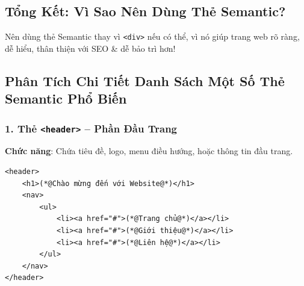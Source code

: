 \documentclass[11pt,oneside]{book}
\newcommand{\thd}[1]{\textcolor{white}{\textbf{\strut #1}}}
\newcommand{\codeinline}[1]{\textcolor{accentOrange}{\texttt{#1}}}
\begin{document}
\subsection{Tổng Kết: Vì Sao Nên Dùng Thẻ Semantic?}

\begin{prettyTableBox}
\end{prettyTableBox}

\begin{conceptBox}
Nên dùng thẻ Semantic thay vì \codeinline{<div>} nếu có thể, vì nó giúp trang web rõ ràng, dễ hiểu, thân thiện với SEO \& dễ bảo trì hơn!
\end{conceptBox}

\subsection{Phân Tích Chi Tiết Danh Sách Một Số Thẻ Semantic Phổ Biến}

\subsubsection{1. Thẻ \codeinline{<header>} -- Phần Đầu Trang}
\textbf{Chức năng}: Chứa tiêu đề, logo, menu điều hướng, hoặc thông tin đầu trang.

\begin{codeWindow}
\begin{lstlisting}[language=HTML5]
<header>
    <h1>(*@Chào mừng đến với Website@*)</h1>
    <nav>
        <ul>
            <li><a href="#">(*@Trang chủ@*)</a></li>
            <li><a href="#">(*@Giới thiệu@*)</a></li>
            <li><a href="#">(*@Liên hệ@*)</a></li>
        </ul>
    </nav>
</header>
\end{lstlisting}
\end{codeWindow}
\end{document}
